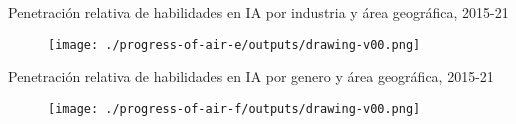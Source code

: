 {

\begin{frame}{
Penetraci\'on relativa de habilidades en IA por industria y \'area geogr\'afica, 2015-21
}

\begin{figure}
 \centering
 \texttt{[image: ./progress-of-air-e/outputs/drawing-v00.png]}
\end{figure}

\end{frame}
}



{

\begin{frame}{
Penetraci\'on relativa de habilidades en IA por genero y \'area geogr\'afica, 2015-21
}


\begin{figure}
 \centering
 \texttt{[image: ./progress-of-air-f/outputs/drawing-v00.png]}
\end{figure}

\end{frame}
}





